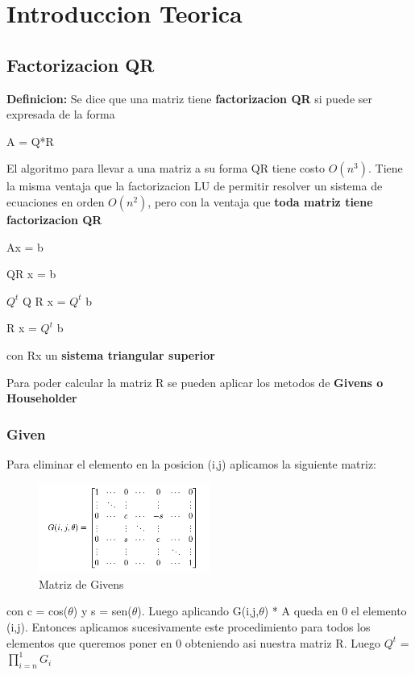 \section{Introduccion Teorica}
\subsection{Factorizacion QR}
\textbf{Definicion:} Se dice que una matriz tiene \textbf{factorizacion QR} si puede ser expresada de la forma
\begin{center}
A = Q*R
\end{center}

El algoritmo para llevar a una matriz a su forma QR tiene costo $O(n^3).$ Tiene la misma ventaja que la factorizacion LU de permitir resolver un sistema de ecuaciones en orden $O(n^2)$, pero con la ventaja que \textbf{toda matriz tiene factorizacion QR}

\begin{center}
Ax = b

QR x = b

$Q^t$ Q R x = $Q^t$ b

R x = $Q^t$ b

con Rx un \textbf{sistema triangular superior}
\end{center}

Para poder calcular la matriz R se pueden aplicar los metodos de \textbf{Givens o Householder}

\subsubsection{Given}

Para eliminar el elemento en la posicion (i,j) aplicamos la siguiente matriz:

\begin{figure}[H] 
\begin{center}
\includegraphics[width=0.5\textwidth]{img/givens.png} 
\caption{Matriz de Givens} 
\end{center}
\end{figure}

con c = cos($\theta$) y s = sen($\theta$). Luego aplicando G(i,j,$\theta$) * A queda en 0 el elemento (i,j). Entonces aplicamos sucesivamente este procedimiento para todos los elementos que queremos poner en 0 obteniendo asi nuestra matriz R. Luego $Q^t$ =  $\prod_{i = n}^1 G_i $

